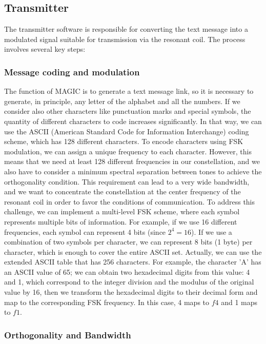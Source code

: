 \subsection {Transmitter}

The transmitter software is responsible for converting the text message into a modulated signal suitable for transmission via the resonant coil. The process involves several key steps:

\subsubsection{Message coding and modulation}

The function of MAGIC is to generate a text message link, so it is necessary to generate, in principle, any letter of the alphabet and all the numbers. If we consider also other characters like punctuation marks and special symbols, the quantity of different characters to code increases significantly. In that way, we can use the ASCII (American Standard Code for Information Interchange) coding scheme, which has 128 different characters.
\newp
To encode characters using FSK modulation, we can assign a unique frequency to each character. However, this means that we need at least 128 different frequencies in our constellation, and we also have to consider a minimum spectral separation between tones to achieve the orthogonality condition. This requirement can lead to a very wide bandwidth, and we want to concentrate the constellation at the center frequency of the resonant coil in order to favor the conditions of communication.
\newp
To address this challenge, we can implement a multi-level FSK scheme, where each symbol represents multiple bits of information. For example, if we use 16 different frequencies, each symbol can represent 4 bits (since $2^4 = 16$). If we use a combination of two symbols per character, we can represent 8 bits (1 byte) per character, which is enough to cover the entire ASCII set. Actually, we can use the extended ASCII table that has 256 characters.
\newp
For example, the character 'A' has an ASCII value of 65; we can obtain two hexadecimal digits from this value: 4 and 1, which correspond to the integer division and the modulus of the original value by 16, then we transform the hexadecimal digits to their decimal form and map to the corresponding FSK frequency. In this case, 4 maps to $f4$ and 1 maps to $f1$.

\subsubsection{Orthogonality and Bandwidth}\label{subsec: ortogonality}

